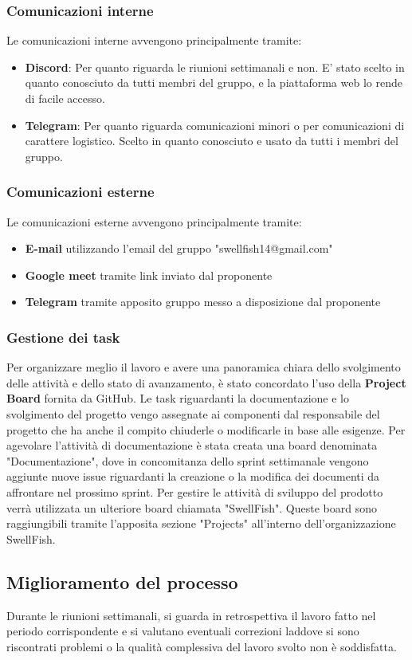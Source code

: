 \documentclass[12pt]{article}
\begin{document}
\subsubsection{Comunicazioni interne}
Le comunicazioni interne avvengono principalmente tramite:
\begin{itemize}
    \item \textbf{Discord}: Per quanto riguarda le riunioni settimanali e non. E' stato scelto in quanto conosciuto da tutti membri del gruppo, e la piattaforma web lo rende di facile accesso.
    \item \textbf{Telegram}: Per quanto riguarda comunicazioni minori o per comunicazioni di carattere logistico. Scelto in quanto conosciuto e usato da tutti i membri del gruppo.
\end{itemize}

\subsubsection{Comunicazioni esterne}
Le comunicazioni esterne avvengono principalmente tramite:
\begin{itemize}
    \item \textbf{E-mail} utilizzando l'email del gruppo "swellfish14@gmail.com"
    \item \textbf{Google meet} tramite link inviato dal proponente
    \item \textbf{Telegram} tramite apposito gruppo messo a disposizione dal proponente
\end{itemize}

\subsubsection{Gestione dei task}
Per organizzare meglio il lavoro e avere una panoramica chiara dello svolgimento delle attività e dello stato di avanzamento, è stato concordato l'uso della \textbf{Project Board} fornita da GitHub.
Le task riguardanti la documentazione e lo svolgimento del progetto vengo assegnate ai componenti dal responsabile del progetto che ha anche il compito chiuderle o modificarle in base alle esigenze.
Per agevolare l'attività di documentazione è stata creata una board denominata "Documentazione", dove in concomitanza dello sprint settimanale vengono aggiunte nuove issue riguardanti la creazione o la modifica dei documenti da affrontare nel prossimo sprint.
Per gestire le attività di sviluppo del prodotto verrà utilizzata un ulteriore board chiamata "SwellFish".
Queste board sono raggiungibili tramite l'apposita sezione "Projects" all'interno dell'organizzazione SwellFish.


\subsection{Miglioramento del processo}
Durante le riunioni settimanali, si guarda in retrospettiva il lavoro fatto nel periodo corrispondente e si valutano eventuali correzioni laddove si sono riscontrati problemi o la qualità complessiva del lavoro svolto non è soddisfatta.
\end{document}
